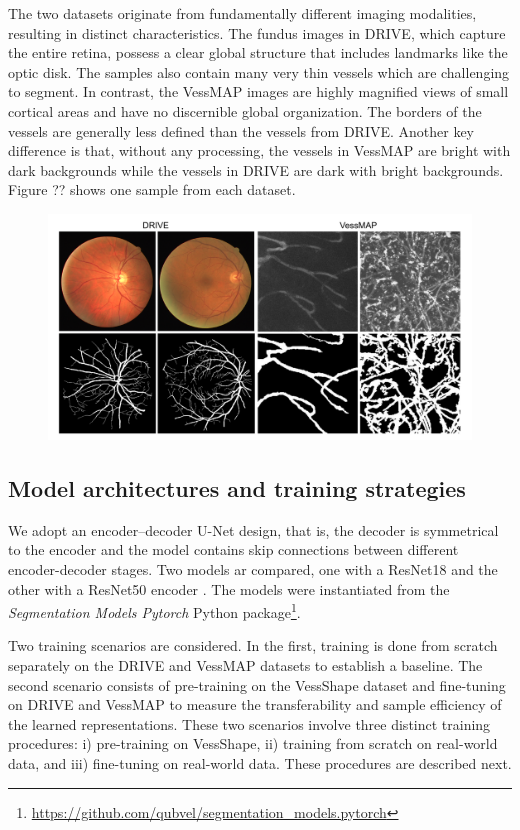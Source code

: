 \documentclass[%
reprint,
nofootinbib,
 amsmath,amssymb,
aps,
superscriptaddress,
showkeys,
longbibliography
]{revtex4-1}
\begin{document}
The two datasets originate from fundamentally different imaging modalities, resulting in distinct characteristics. The fundus images in DRIVE, which capture the entire retina, possess a clear global structure that includes landmarks like the optic disk. The samples also contain many very thin vessels which are challenging to segment. In contrast, the VessMAP images are highly magnified views of small cortical areas and have no discernible global organization. The borders of the vessels are generally less defined than the vessels from DRIVE. Another key difference is that, without any processing, the vessels in VessMAP are bright with dark backgrounds while the vessels in DRIVE are dark with bright backgrounds. Figure ?? shows one sample from each dataset.

\begin{figure}[tbp]
    \centering
    \includegraphics[width=\columnwidth]{figures/results/drive_vessmap_samples.pdf}
    \caption{}
    \label{f:drive_vessmap_samples}
\end{figure}

\subsection{Model architectures and training strategies}

We adopt an encoder–decoder U-Net design, that is, the decoder is symmetrical to the encoder and the model contains skip connections between different encoder-decoder stages. Two models ar compared, one with a ResNet18 and the other with a ResNet50 encoder \cite{}. The models were instantiated from the \textit{Segmentation Models Pytorch} Python package\footnote{\url{https://github.com/qubvel/segmentation_models.pytorch}}.

Two training scenarios are considered. In the first, training is done from scratch separately on the DRIVE and VessMAP datasets to establish a baseline. The second scenario consists of pre-training on the VessShape dataset and fine-tuning on DRIVE and VessMAP to measure the transferability and sample efficiency of the learned representations. These two scenarios involve three distinct training procedures: i) pre-training on VessShape, ii) training from scratch on real-world data, and iii) fine-tuning on real-world data. These procedures are described next.
\end{document}
